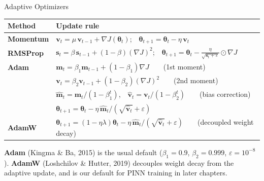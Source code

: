 \documentclass[aspectratio=169,11pt]{beamer}
\begin{document}
\begin{frame}{Adaptive Optimizers}
\begin{small}
\renewcommand{\arraystretch}{1.25}
\begin{tabular}{lp{9cm}}
\toprule
\textbf{Method} & \textbf{Update rule} \\
\midrule
\textbf{Momentum} & $\bm{v}_t = \mu\,\bm{v}_{t-1} + \nabla J(\bm{\theta}_t)$;~~$\bm{\theta}_{t+1} = \bm{\theta}_t - \eta\,\bm{v}_t$ \\[2pt]
\textbf{RMSProp} & $\bm{s}_t = \beta\,\bm{s}_{t-1} + (1-\beta)(\nabla J)^2$;~~$\bm{\theta}_{t+1} = \bm{\theta}_t - \frac{\eta}{\sqrt{\bm{s}_t + \varepsilon}}\odot\nabla J$ \\[2pt]
\textbf{Adam} & $\bm{m}_t = \beta_1\bm{m}_{t-1} + (1-\beta_1)\nabla J$~~~~(1st moment) \\
& $\bm{v}_t = \beta_2\bm{v}_{t-1} + (1-\beta_2)(\nabla J)^2$~~~~(2nd moment) \\
& $\hat{\bm{m}}_t = \bm{m}_t/(1-\beta_1^t)$,~~$\hat{\bm{v}}_t = \bm{v}_t/(1-\beta_2^t)$~~~~(bias correction) \\
& $\bm{\theta}_{t+1} = \bm{\theta}_t - \eta\,\hat{\bm{m}}_t \big/ (\sqrt{\hat{\bm{v}}_t} + \varepsilon)$ \\[2pt]
\textbf{AdamW} & $\bm{\theta}_{t+1} = (1-\eta\lambda)\bm{\theta}_t - \eta\,\hat{\bm{m}}_t \big/ (\sqrt{\hat{\bm{v}}_t} + \varepsilon)$~~~~(decoupled weight decay) \\
\bottomrule
\end{tabular}
\end{small}

\vspace{0.2cm}
{\footnotesize \textbf{Adam} (Kingma \& Ba, 2015) is the usual default ($\beta_1=0.9$, $\beta_2=0.999$, $\varepsilon=10^{-8}$).  \textbf{AdamW} (Loshchilov \& Hutter, 2019) decouples weight decay from the adaptive update, and is our default for PINN training in later chapters.}
\end{frame}
\end{document}
